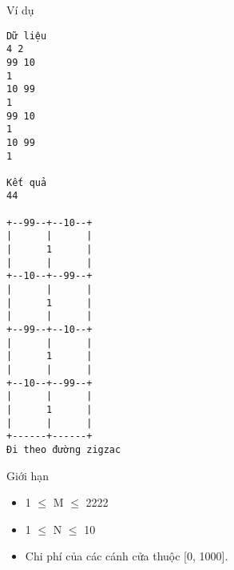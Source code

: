 Ví dụ
\begin{verbatim}
Dữ liệu
4 2
99 10
1
10 99
1
99 10
1
10 99
1

Kết quả
44

+--99--+--10--+
|      |      |
|      1      |
|      |      |
+--10--+--99--+
|      |      |
|      1      |
|      |      |
+--99--+--10--+
|      |      |
|      1      |
|      |      |
+--10--+--99--+
|      |      |
|      1      |
|      |      |
+------+------+
Đi theo đường zigzac
\end{verbatim}
Giới hạn
\begin{itemize}
	\item 1  $\le$  M  $\le$  2222
	\item 1  $\le$  N  $\le$  10
	\item Chi phí của các cánh cửa thuộc [0, 1000].
\end{itemize}